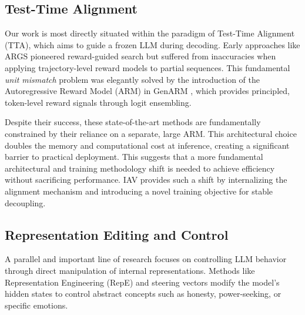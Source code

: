 \documentclass{article} %
\begin{document}
\subsection{Test-Time Alignment}
Our work is most directly situated within the paradigm of Test-Time Alignment (TTA), which aims to guide a frozen LLM during decoding. Early approaches like ARGS \citep{khanov2024args} pioneered reward-guided search but suffered from inaccuracies when applying trajectory-level reward models to partial sequences. This fundamental \textit{unit mismatch} problem was elegantly solved by the introduction of the Autoregressive Reward Model (ARM) in GenARM \citep{xu2024genarm}, which provides principled, token-level reward signals through logit ensembling.

Despite their success, these state-of-the-art methods are fundamentally constrained by their reliance on a separate, large ARM. This architectural choice doubles the memory and computational cost at inference, creating a significant barrier to practical deployment. This suggests that a more fundamental architectural and training methodology shift is needed to achieve efficiency without sacrificing performance. IAV provides such a shift by internalizing the alignment mechanism and introducing a novel training objective for stable decoupling.

\subsection{Representation Editing and Control}
A parallel and important line of research focuses on controlling LLM behavior through direct manipulation of internal representations. Methods like Representation Engineering (RepE) \citep{zou2023representation} and steering vectors \citep{turner2023steering} modify the model's hidden states to control abstract concepts such as honesty, power-seeking, or specific emotions.
\end{document}
